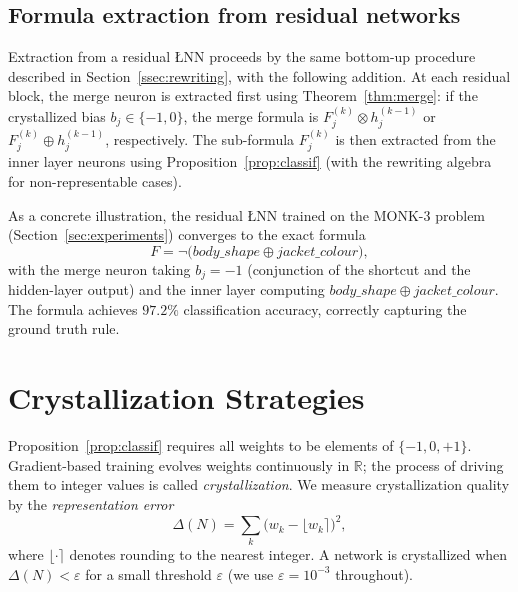 \documentclass[lettersize,journal]{IEEEtran}
\newcommand{\tnorm}{\otimes}      %
\newcommand{\disj}{\oplus}        %
\newcommand{\LNN}{\L{}NN}
\begin{document}
\subsection{Formula extraction from residual networks}
\label{ssec:res_extract}

Extraction from a residual \LNN{} proceeds by the same bottom-up procedure
described in Section~\ref{ssec:rewriting}, with the following addition.
At each residual block, the merge neuron is extracted first using
Theorem~\ref{thm:merge}: if the crystallized bias $b_j \in \{-1,0\}$, the
merge formula is $F^{(k)}_j \tnorm h^{(k-1)}_j$ or
$F^{(k)}_j \disj h^{(k-1)}_j$, respectively.
The sub-formula $F^{(k)}_j$ is then extracted from the inner layer neurons
using Proposition~\ref{prop:classif} (with the rewriting algebra for
non-representable cases).

As a concrete illustration, the residual \LNN{} trained on the MONK-3 problem
(Section~\ref{sec:experiments}) converges to the exact formula
\begin{equation}
  F = \neg\!\bigl(\mathit{body\_shape} \disj \mathit{jacket\_colour}\bigr),
  \label{eq:monk3}
\end{equation}
with the merge neuron taking $b_j = -1$ (conjunction of the shortcut and
the hidden-layer output) and the inner layer computing
$\mathit{body\_shape} \disj \mathit{jacket\_colour}$.
The formula achieves $97.2\%$ classification accuracy, correctly capturing the
ground truth rule.

\section{Crystallization Strategies}
\label{sec:crystal}

Proposition~\ref{prop:classif} requires all weights to be elements of
$\{-1, 0, +1\}$.
Gradient-based training evolves weights continuously in $\mathbb{R}$; the
process of driving them to integer values is called \emph{crystallization}.
We measure crystallization quality by the \emph{representation error}
\begin{equation}
  \Delta(N) = \sum_{k} \bigl(w_k - \lfloor w_k \rceil\bigr)^2,
  \label{eq:delta}
\end{equation}
where $\lfloor \cdot \rceil$ denotes rounding to the nearest integer.
A network is crystallized when $\Delta(N) < \varepsilon$ for a small
threshold $\varepsilon$ (we use $\varepsilon = 10^{-3}$ throughout).
\end{document}
